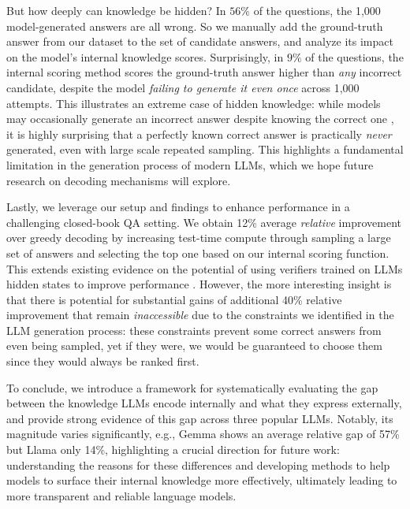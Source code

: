 But how deeply can knowledge be hidden? In $56\%$ of the questions, the 1,000 model-generated answers are all wrong. So we manually add the ground-truth answer from our dataset to the set of candidate answers, and analyze its impact on the model's internal knowledge scores. 
Surprisingly, in $9\%$ of the questions, the internal scoring method scores the ground-truth answer higher than \textit{any} incorrect candidate, despite the model \textit{failing to generate it even once} across 1,000 attempts. This illustrates an extreme case of hidden knowledge: while models may occasionally generate an incorrect answer despite knowing the correct one \citep{simhi2024distinguishing}, it is highly surprising that a perfectly known correct answer is practically \textit{never} generated, even with large scale repeated sampling. This highlights a fundamental limitation in the generation process of modern LLMs, which we hope future research on decoding mechanisms will explore. 


Lastly, we leverage our setup and findings to enhance performance in a challenging closed-book QA setting. We obtain 12\% average \textit{relative} improvement over greedy decoding by increasing test-time compute through sampling a large set of answers and selecting the top one based on our internal scoring function. This extends existing evidence on the potential of using verifiers trained on LLMs hidden states to improve performance \citep{orgad2024llms}.
However, the more interesting insight is that there is potential for substantial gains of additional 40\% relative improvement that remain \textit{inaccessible} due to the constraints we identified in the LLM generation process: these constraints prevent some correct answers from even being sampled, yet if they were, we would be guaranteed to choose them since they would always be ranked first.



To conclude, we introduce a framework for systematically evaluating the gap between the knowledge LLMs encode internally and what they express externally, and provide strong evidence of this gap across three popular LLMs. Notably, its magnitude varies significantly, e.g., Gemma \citep{team2024gemma} shows an average relative gap of 57\% but Llama \citep{dubey2024llama} only 14\%, highlighting a crucial direction for future work: understanding the reasons for these differences and developing methods to help models to surface their internal knowledge more effectively, ultimately leading to more transparent and reliable language models.

